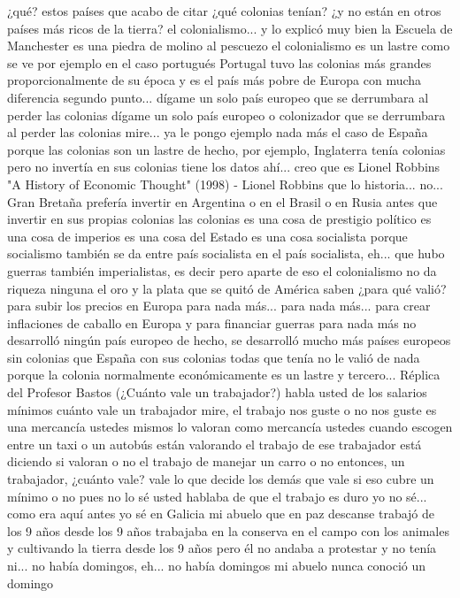 ¿qué? estos países que acabo de citar ¿qué colonias tenían?
¿y no están en otros países más ricos de la tierra? el colonialismo...
y lo explicó muy bien la Escuela de Manchester es una piedra de molino al pescuezo el colonialismo es un lastre como se ve por ejemplo en el caso portugués
Portugal tuvo las colonias más grandes proporcionalmente de su época y es el país más pobre de Europa con mucha diferencia
segundo punto... dígame un solo país europeo que se derrumbara al perder las colonias
dígame un solo país europeo o colonizador que se derrumbara al perder las colonias mire...
ya le pongo ejemplo nada más el caso de España porque las colonias son un lastre de hecho, por ejemplo, Inglaterra
tenía colonias pero no invertía en sus colonias tiene los datos ahí... creo que es Lionel Robbins
"A History of Economic Thought" (1998) - Lionel Robbins
que lo historia... no... Gran Bretaña prefería invertir en Argentina o en el Brasil
o en Rusia antes que invertir en sus propias colonias las colonias es una cosa de prestigio político es una cosa de imperios es una cosa del Estado
es una cosa socialista porque socialismo también se da entre país socialista
en el país socialista, eh... que hubo guerras también imperialistas, es decir pero aparte de eso el colonialismo no da riqueza ninguna
el oro y la plata que se quitó de América saben ¿para qué valió? para subir los precios en Europa para nada más...
para nada más... para crear inflaciones de caballo en Europa y para financiar guerras para nada más no desarrolló ningún país europeo
de hecho, se desarrolló mucho más países europeos sin colonias que España con sus colonias todas que tenía
no le valió de nada porque la colonia normalmente económicamente es un lastre y tercero...
Réplica del Profesor Bastos (¿Cuánto vale un trabajador?)
habla usted de los salarios mínimos cuánto vale un trabajador mire, el trabajo nos guste o no nos guste
es una mercancía ustedes mismos lo valoran como mercancía ustedes cuando escogen entre un taxi
o un autobús están valorando el trabajo de ese trabajador está diciendo si valoran o no el trabajo de manejar un carro o no
entonces, un trabajador, ¿cuánto vale? vale lo que decide los demás que vale si eso cubre un mínimo o no
pues no lo sé usted hablaba de que el trabajo es duro yo no sé... como era aquí antes yo sé en Galicia mi abuelo
que en paz descanse trabajó de los 9 años desde los 9 años trabajaba en la conserva
en el campo con los animales y cultivando la tierra desde los 9 años
pero él no andaba a protestar y no tenía ni... no había domingos, eh... no había domingos mi abuelo nunca conoció un domingo
